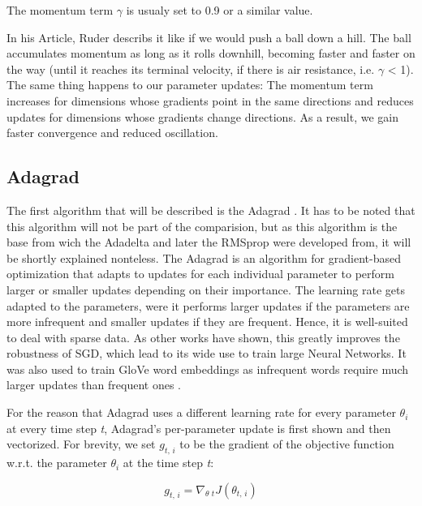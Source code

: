 \documentclass[12pt,oneside,a4paper,parskip]{scrbook}
\begin{document}
The momentum term $\gamma $ is usualy set to 0.9 or a similar value.

In his Article, Ruder \cite{overvieDiffRSLVQ} describs it like if we would push a ball down a hill. 
The ball accumulates momentum as long as it rolls downhill, becoming faster and faster on the way 
(until it reaches its terminal velocity, if there is air resistance, i.e. $\gamma $ < 1). 
The same thing happens to our parameter updates: The momentum term increases for dimensions whose gradients
point in the same directions and reduces updates for dimensions whose gradients change directions.
As a result, we gain faster convergence and reduced oscillation.

\subsection{Adagrad}
The first algorithm that will be described is the Adagrad \cite{Zeiler2012ADADELTAAA}. It has to be noted that this 
algorithm will not be part of the comparision, but as this algorithm is the base from wich the Adadelta and later the 
RMSprop were developed from, it will be shortly explained nonteless.
The Adagrad is an algorithm for gradient-based optimization that adapts to updates for each individual parameter to 
perform larger or smaller updates depending on their importance. The learning rate gets adapted to the parameters, were
it performs larger updates if the parameters are more infrequent and smaller updates if they are frequent.
Hence, it is well-suited to deal with sparse data. As other works \cite{dean2012large} have shown, this greatly improves
the robustness of SGD, which lead to its wide use to train large Neural Networks.
It was also used to train GloVe word embeddings as infrequent words require
much larger updates than frequent ones \cite{pennington2014glove, overvieDiffRSLVQ}.   

For the reason that Adagrad uses a different learning rate for every parameter $\theta_i$ at every time step \textit{t},
Adagrad's per-parameter update is first shown and then vectorized. For brevity, we set $\textit{g}_\textit{t, i}$ to be
the gradient of the objective function w.r.t. the parameter $\theta_i$ at the time step \textit{t}:

\begin{equation}
  \textit{g}_\textit{t, i} = \nabla_\textit{$\theta$ t}\textit{J}(\theta_\textit{t, i})
  \label{equ:Adagrad_1}
\end{equation}
\end{document}
